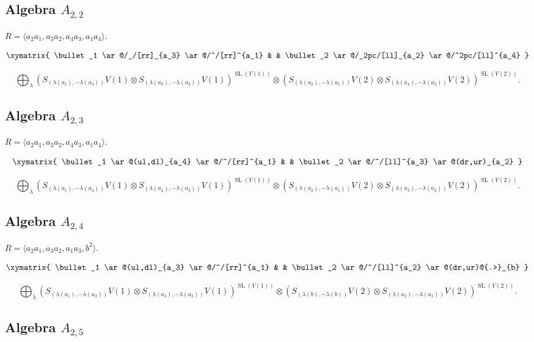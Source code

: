 \documentclass[11pt,oneside]{amsbook}
\numberwithin{equation}{section}
\theoremstyle{plain}
\theoremstyle{definition}
\theoremstyle{remark}
\DeclareMathOperator{\SL}{\mathrm{SL}}
\newcommand{\la}{\langle}
\newcommand{\ra}{\rangle}
\begin{document}
					
					
					\subsection{Algebra $A_{2,2}$}
					
					$R= \la a_2a_1, a_3a_2, a_4a_3, a_1a_4 \ra$. 
					
					\[ \xymatrix{
						\bullet_1 \ar@/_/[rr]_{a_3} \ar@/^/[rr]^{a_1} & & \bullet_2 \ar@/_2pc/[ll]_{a_2} \ar@/^2pc/[ll]^{a_4}
					}\]
					
					\[ \bigoplus_{\lambda} \left( S_{(\lambda(a_1), -\lambda(a_4))}V(1) \otimes S_{(\lambda(a_3), -\lambda(a_2))}V(1)\right)^{\SL(V(1))} \otimes \left(S_{(\lambda(a_2), -\lambda(a_1))}V(2) \otimes S_{(\lambda(a_4),-\lambda(a_3))}V(2)\right)^{\SL(V(2))}.\]
					
					
					\subsection{Algebra $A_{2,3}$}
					
					$R= \la a_2a_1, a_3a_2, a_4a_3, a_1a_4 \ra$. 
					
					\[ \xymatrix{
						\bullet_1 \ar@(ul,dl)_{a_4} \ar@/^/[rr]^{a_1} & & \bullet_2 \ar@/^/[ll]^{a_3} \ar@(dr,ur)_{a_2}
					}\]
					
					
					\[ \bigoplus_{\lambda} \left( S_{(\lambda(a_1), -\lambda(a_4))}V(1) \otimes S_{(\lambda(a_4), -\lambda(a_3))}V(1)\right)^{\SL(V(1))} \otimes \left(S_{(\lambda(a_2), -\lambda(a_1))}V(2) \otimes S_{(\lambda(a_3),-\lambda(a_2))}V(2)\right)^{\SL(V(2))}.\]
					
					
					\subsection{Algebra $A_{2,4}$}
					
					$R = \la a_2a_1, a_3a_2, a_1a_3, b^2 \ra$. 
					
					\[ \xymatrix{
						\bullet_1 \ar@(ul,dl)_{a_3} \ar@/^/[rr]^{a_1} & & \bullet_2 \ar@/^/[ll]^{a_2} \ar@(dr,ur)@{.>}_{b}
					}\]
					
					
					\[ \bigoplus_{\lambda} \left( S_{(\lambda(a_1), -\lambda(a_3))}V(1) \otimes S_{(\lambda(a_3), -\lambda(a_2))}V(1)\right)^{\SL(V(1))} \otimes \left(S_{(\lambda(b), -\lambda(b))}V(2) \otimes S_{(\lambda(a_2),-\lambda(a_1))}V(2)\right)^{\SL(V(2))}.\]
					
					
					
					\subsection{Algebra $A_{2,5}$}
					
\end{document}
